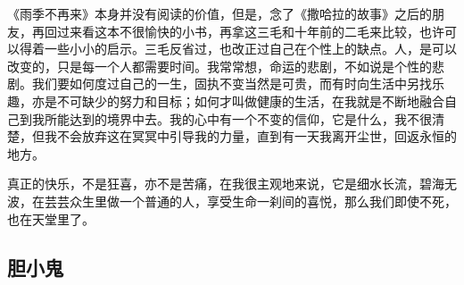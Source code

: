 \par 《雨季不再来》本身并没有阅读的价值，但是，念了《撒哈拉的故事》之后的朋友，再回过来看这本不很愉快的小书，再拿这三毛和十年前的二毛来比较，也许可以得着一些小小的启示。三毛反省过，也改正过自己在个性上的缺点。人，是可以改变的，只是每一个人都需要时间。我常常想，命运的悲剧，不如说是个性的悲剧。我们要如何度过自己的一生，固执不变当然是可贵，而有时向生活中另找乐趣，亦是不可缺少的努力和目标；如何才叫做健康的生活，在我就是不断地融合自己到我所能达到的境界中去。我的心中有一个不变的信仰，它是什么，我不很清楚，但我不会放弃这在冥冥中引导我的力量，直到有一天我离开尘世，回返永恒的地方。
\par 真正的快乐，不是狂喜，亦不是苦痛，在我很主观地来说，它是细水长流，碧海无波，在芸芸众生里做一个普通的人，享受生命一刹间的喜悦，那么我们即使不死，也在天堂里了。




\subsection{胆小鬼}


